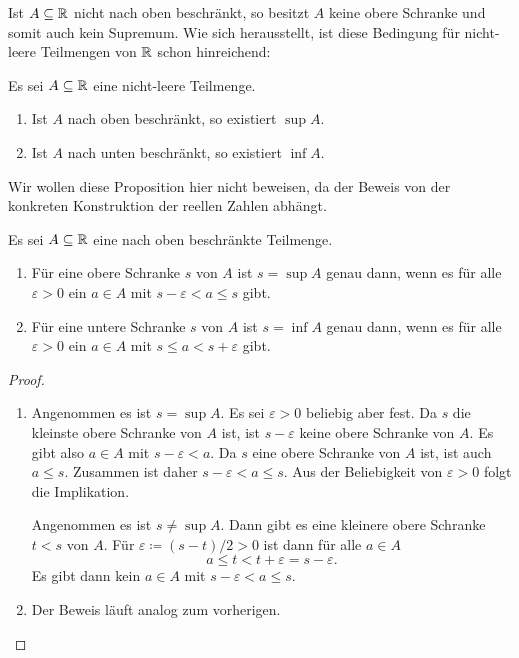 \documentclass[a4paper,10pt]{article}
\begin{document}
Ist $A \subseteq \mathbb{R}$ nicht nach oben beschränkt, so besitzt $A$ keine obere Schranke und somit auch kein Supremum. Wie sich herausstellt, ist diese Bedingung für nicht-leere Teilmengen von $\mathbb{R}$ schon hinreichend:


\begin{prop}
 Es sei $A \subseteq \mathbb{R}$ eine nicht-leere Teilmenge.
 \begin{enumerate}
  \item
   Ist $A$ nach oben beschränkt, so existiert $\sup A$.
  \item
   Ist $A$ nach unten beschränkt, so existiert $\inf A$.
 \end{enumerate}
\end{prop}


Wir wollen diese Proposition hier nicht beweisen, da der Beweis von der konkreten Konstruktion der reellen Zahlen abhängt.


\begin{lem}
 Es sei $A \subseteq \mathbb{R}$ eine nach oben beschränkte Teilmenge.
 \begin{enumerate}
  \item
   Für eine obere Schranke $s$ von $A$ ist $s = \sup A$ genau dann, wenn es für alle $\varepsilon > 0$ ein $a \in A$ mit $s-\varepsilon < a \leq s$ gibt.
  \item
   Für eine untere Schranke $s$ von $A$ ist $s = \inf A$ genau dann, wenn es für alle $\varepsilon > 0$ ein $a \in A$ mit $s \leq a < s + \varepsilon$ gibt.
 \end{enumerate}
\end{lem}
\begin{proof}
 \begin{enumerate}
  \item
   Angenommen es ist $s = \sup A$. Es sei $\varepsilon > 0$ beliebig aber fest. Da $s$ die kleinste obere Schranke von $A$ ist, ist $s-\varepsilon$ keine obere Schranke von $A$. Es gibt also $a \in A$ mit $s-\varepsilon < a$. Da $s$ eine obere Schranke von $A$ ist, ist auch $a \leq s$. Zusammen ist daher $s-\varepsilon < a \leq s$. Aus der Beliebigkeit von $\varepsilon > 0$ folgt die Implikation.
   
   Angenommen es ist $s \neq \sup A$. Dann gibt es eine kleinere obere Schranke $t < s$ von $A$. Für $\varepsilon \coloneqq (s-t)/2 > 0$ ist dann für alle $a \in A$
   \[
    a \leq t < t + \varepsilon = s - \varepsilon.
   \]
   Es gibt dann kein $a \in A$ mit $s-\varepsilon < a \leq s$.
  \item
   Der Beweis läuft analog zum vorherigen.
 \end{enumerate}
\end{proof}
\end{document}

